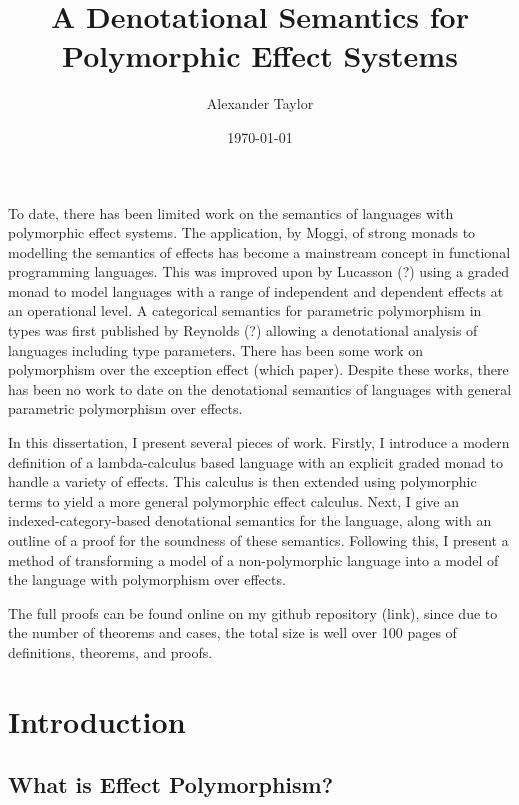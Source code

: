 \documentclass{Report}
\title{A Denotational Semantics for Polymorphic Effect Systems}
\date{\today}
\author{Alexander Taylor}
\begin{document}
\maketitle


\abstract
    
To date, there has been limited work on the semantics of languages with polymorphic effect systems. The application, by Moggi, of strong monads to modelling the semantics of effects has become a mainstream concept in functional programming languages. This was improved upon by Lucasson (?) using a graded monad to model languages with a range of independent and dependent effects at an operational level. A categorical semantics for parametric polymorphism in types was first published by Reynolds (?) allowing a denotational analysis of languages including type parameters. There has been some work on polymorphism over the exception effect (which paper). Despite these works, there has been no work to date on the denotational semantics of languages with general parametric polymorphism over effects.

In this dissertation, I present several pieces of work. Firstly, I introduce a modern definition of a lambda-calculus based language with an explicit graded monad to handle a variety of effects. This calculus is then extended using polymorphic terms to yield a more general polymorphic effect calculus. Next, I give an indexed-category-based denotational semantics for the language, along with an outline of a proof for the soundness of these semantics. Following this, I present a method of transforming a model of a non-polymorphic language into a model of the language with polymorphism over effects.

The full proofs can be found online on my github repository (link), since due to the number of theorems and cases, the total size is well over 100 pages of definitions, theorems, and proofs.

\tableofcontents

\chapter{Introduction}
\section{What is Effect Polymorphism?}
\end{document}

